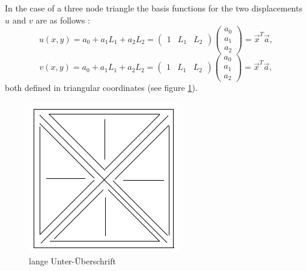 \documentclass[11pt,twoside]{scrartcl}
\begin{document}
  In the case of a three node triangle the basis functions for the two displacements $u$ and $v$ are as follows \cite{steinke2005finite}:
  \begin{equation}\label{eq:t3_ansatzU}
  u(x,y) = a_0 + a_1L_1 + a_2L_2 = \begin{pmatrix}
  1 & L_1 & L_2
  \end{pmatrix} \begin{pmatrix}
  a_0 \\ a_1 \\ a_2
  \end{pmatrix} = \vec{x}^T \vec{a},
  \end{equation}
  \begin{equation}\label{eq:t3_ansatzV}
  v(x,y) = a_0 + a_1L_1 + a_2L_2 = \begin{pmatrix}
  1 & L_1 & L_2
  \end{pmatrix} \begin{pmatrix}
  a_0 \\ a_1 \\ a_2
  \end{pmatrix} = \vec{x}^T \vec{a},
  \end{equation}
  both defined in triangular coordinates (see figure \ref{fig:platzhalter}).
  \begin{figure}
  	\centering
  	\includegraphics[width=0.7\linewidth]{figures/platzhalter}
  	\caption[kurze Unter-Überschrift]{lange Unter-Überschrift}
  	\label{fig:platzhalter}
  \end{figure}
\end{document}
